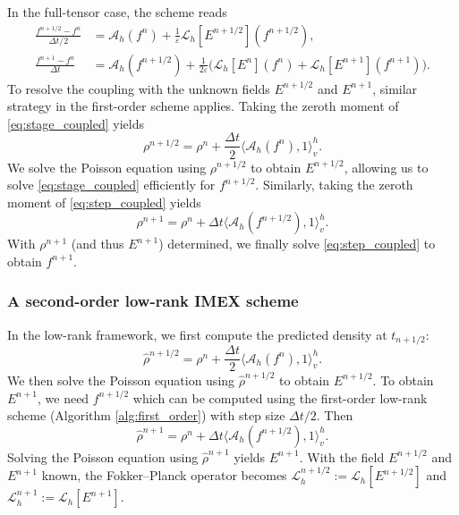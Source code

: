 \documentclass[]{article}
\numberwithin{equation}{section}
\begin{document}
In the full-tensor case, the scheme reads
\begin{align}
    \frac{f^{n+1/2} - f^n}{\Delta t/2} &= \mathcal{A}_h(f^n) + \frac{1}{\varepsilon}\mathcal{L}_h[E^{n+1/2}](f^{n+1/2}),\label{eq:stage_coupled} \\
    \frac{f^{n+1} - f^n}{\Delta t} &= \mathcal{A}_h(f^{n+1/2}) + \frac{1}{2\varepsilon}\Big( \mathcal{L}_h[E^n](f^n) + \mathcal{L}_h[E^{n+1}](f^{n+1}) \Big).\label{eq:step_coupled}
\end{align}
To resolve the coupling with the unknown fields $E^{n+1/2}$ and $E^{n+1}$, similar strategy in the first-order scheme applies. 
Taking the zeroth moment of \eqref{eq:stage_coupled} yields
\begin{equation}\label{eq:dens_pred}
  \rho^{n+1/2} = \rho^{n} + \frac{\Delta t}{2} \langle \mathcal{A}_h(f^n), 1 \rangle_v^h.
\end{equation}
We solve the Poisson equation using $\rho^{n+1/2}$ to obtain $E^{n+1/2}$, allowing us to solve \eqref{eq:stage_coupled} efficiently for $f^{n+1/2}$.
Similarly, taking the zeroth moment of \eqref{eq:step_coupled} yields 
\begin{equation}\label{eq:dens_corr}
  \rho^{n+1} = \rho^{n} + \Delta t \langle \mathcal{A}_h(f^{n+1/2}), 1 \rangle_v^h.
\end{equation}
With $\rho^{n+1}$ (and thus $E^{n+1}$) determined, we finally solve \eqref{eq:step_coupled} to obtain $f^{n+1}$.

\subsubsection{A second-order low-rank IMEX scheme}
\label{sec:lowrank_second_order}

In the low-rank framework, we first compute the predicted density at $t_{n+1/2}$:
\begin{equation}
    \hat{\rho}^{n+1/2} = \rho^n + \frac{\Delta t}{2} \langle \mathcal{A}_h(f^n), 1 \rangle_v^h.
\end{equation}
We then solve the Poisson equation using $\hat{\rho}^{n+1/2}$ to obtain $E^{n+1/2}$. To obtain $E^{n+1}$, we need $f^{n+1/2}$ which can be computed using the first-order low-rank scheme (Algorithm \ref{alg:first_order}) with step size $\Delta t/2$. Then 
\begin{equation}
    \hat{\rho}^{n+1} = \rho^n + \Delta t \langle \mathcal{A}_h(f^{n+1/2}), 1 \rangle_v^h.
\end{equation}
Solving the Poisson equation using $\hat{\rho}^{n+1}$ yields $E^{n+1}$.
With the field $E^{n+1/2}$ and $E^{n+1}$ known, the Fokker--Planck operator becomes $\mathcal{L}_h^{n+1/2}:=\mathcal{L}_h[E^{n+1/2}]$ and $\mathcal{L}_h^{n+1}:=\mathcal{L}_h[E^{n+1}]$.
\end{document}
